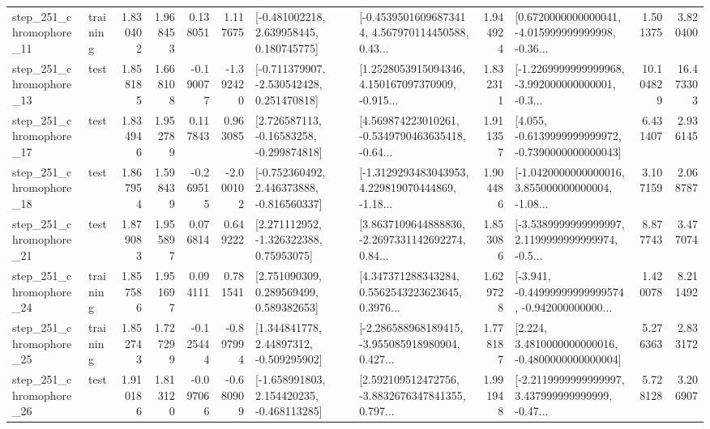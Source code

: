 \begin{tabular}{llrrrrllrlrr}
  step\_251\_chromophore\_11 &  training &      1.830402 &    1.968453 &      0.138051 &  1.117675 &    [-0.481002218, 2.639958445, 0.180745775] &  [-0.45395016096873414, 4.567970114450588, 0.43... &       1.944924 &  [0.6720000000000041, -4.015999999999998, -0.36... &            1.501375 &          3.820400 \\
  step\_251\_chromophore\_13 &      test &      1.858185 &    1.668108 &     -0.190077 & -1.392420 &   [-0.711379907, -2.530542428, 0.251470818] &  [1.2528053915094346, 4.150167097370909, -0.915... &       1.832311 &  [-1.2269999999999968, -3.992000000000001, -0.3... &           10.104829 &         16.473303 \\
  step\_251\_chromophore\_17 &      test &      1.834946 &    1.952789 &      0.117843 &  0.963085 &    [2.726587113, -0.16583258, -0.299874818] &  [4.569874223010261, -0.5349790463635418, -0.64... &       1.911357 &  [4.055, -0.6139999999999972, -0.7390000000000043] &            6.431407 &          2.936145 \\
  step\_251\_chromophore\_18 &      test &      1.867954 &    1.598439 &     -0.269515 & -2.000102 &   [-0.752360492, 2.446373888, -0.816560337] &  [-1.3129293483043953, 4.229819070444869, -1.18... &       1.904486 &  [-1.0420000000000016, 3.855000000000004, -1.08... &            3.107159 &          2.068787 \\
  step\_251\_chromophore\_21 &      test &      1.879083 &    1.955897 &      0.076814 &  0.649222 &     [2.271112952, -1.326322388, 0.75953075] &  [3.8637109644888836, -2.2697331142692274, 0.84... &       1.853086 &  [-3.5389999999999997, 2.1199999999999974, -0.5... &            8.877743 &          3.477074 \\
  step\_251\_chromophore\_24 &  training &      1.857586 &    1.951697 &      0.094111 &  0.781541 &     [2.751090309, 0.289569499, 0.589382653] &  [4.347371288343284, 0.5562543223623645, 0.3976... &       1.629728 &  [-3.941, -0.44999999999999574, -0.942000000000... &            1.420078 &          8.211492 \\
  step\_251\_chromophore\_25 &  training &      1.852743 &    1.727299 &     -0.125444 & -0.897994 &     [1.344841778, 2.44897312, -0.509295902] &  [-2.286588968189415, -3.955085918980904, 0.427... &       1.778187 &   [2.224, 3.4810000000000016, -0.4800000000000004] &            5.276363 &          2.833172 \\
  step\_251\_chromophore\_26 &      test &      1.910186 &    1.813120 &     -0.097066 & -0.680909 &   [-1.658991803, 2.154420235, -0.468113285] &  [2.592109512472756, -3.8832676347841355, 0.797... &       1.991948 &  [-2.2119999999999997, 3.437999999999999, -0.47... &            5.728128 &          3.206907 \\

\end{tabular}

